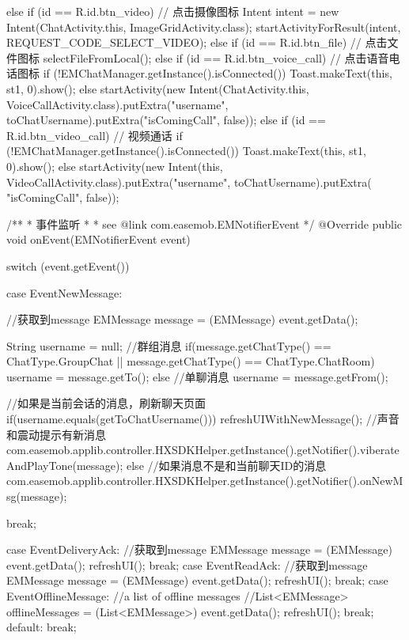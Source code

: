{{{		} else if (id == R.id.btn_video) {
			// 点击摄像图标
			Intent intent = new Intent(ChatActivity.this, ImageGridActivity.class);
			startActivityForResult(intent, REQUEST_CODE_SELECT_VIDEO);
		} else if (id == R.id.btn_file) { // 点击文件图标
			selectFileFromLocal();
		} else if (id == R.id.btn_voice_call) { // 点击语音电话图标
			if (!EMChatManager.getInstance().isConnected())
				Toast.makeText(this, st1, 0).show();
			else
				startActivity(new Intent(ChatActivity.this, VoiceCallActivity.class).putExtra("username",
						toChatUsername).putExtra("isComingCall", false));
		} else if (id == R.id.btn_video_call) { // 视频通话
			if (!EMChatManager.getInstance().isConnected())
				Toast.makeText(this, st1, 0).show();
			else
				startActivity(new Intent(this, VideoCallActivity.class).putExtra("username", toChatUsername).putExtra(
						"isComingCall", false));
		}
	}

	/**
	 * 事件监听
	 * 
	 * see {@link com.easemob.EMNotifierEvent}
     */
    @Override
    public void onEvent(EMNotifierEvent event) {
        switch (event.getEvent()) {
        case EventNewMessage:
        {
            //获取到message
            EMMessage message = (EMMessage) event.getData();
            
            String username = null;
            //群组消息
            if(message.getChatType() == ChatType.GroupChat || message.getChatType() == ChatType.ChatRoom){
                username = message.getTo();
            }
            else{
                //单聊消息
                username = message.getFrom();
            }

            //如果是当前会话的消息，刷新聊天页面
            if(username.equals(getToChatUsername())){
                refreshUIWithNewMessage();
                //声音和震动提示有新消息
                com.easemob.applib.controller.HXSDKHelper.getInstance().getNotifier().viberateAndPlayTone(message);
            }else{
                //如果消息不是和当前聊天ID的消息
                com.easemob.applib.controller.HXSDKHelper.getInstance().getNotifier().onNewMsg(message);
            }

            break;
        }
        case EventDeliveryAck:
        {
            //获取到message
            EMMessage message = (EMMessage) event.getData();
            refreshUI();
            break;
        }
        case EventReadAck:
        {
            //获取到message
            EMMessage message = (EMMessage) event.getData();
            refreshUI();
            break;
        }
        case EventOfflineMessage:
        {
            //a list of offline messages 
            //List<EMMessage> offlineMessages = (List<EMMessage>) event.getData();
            refreshUI();
            break;
        }
        default:
            break;
        }
        
}}
